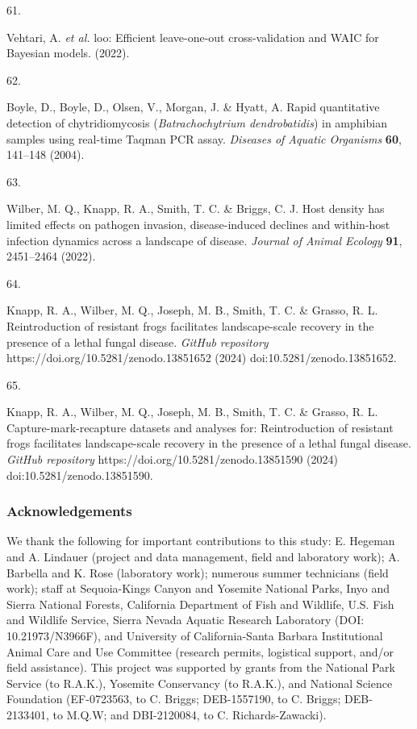\documentclass[
  letterpaper,
  DIV=11,
  numbers=noendperiod]{scrartcl}
\newlength{\cslhangindent}
\newlength{\csllabelwidth}
\newenvironment{CSLReferences}[2] %
 {\begin{list}{}{%
  \setlength{\itemindent}{0pt}
  \setlength{\leftmargin}{0pt}
  \setlength{\parsep}{0pt}
  \ifodd #1
   \setlength{\leftmargin}{\cslhangindent}
   \setlength{\itemindent}{-1\cslhangindent}
  \fi
  \setlength{\itemsep}{#2\baselineskip}}}
 {\end{list}}
\newcommand{\CSLLeftMargin}[1]{\parbox[t]{\csllabelwidth}{\strut#1\strut}}
\newcommand{\CSLRightInline}[1]{\parbox[t]{\linewidth - \csllabelwidth}{\strut#1\strut}}
\begin{document}
\begin{CSLReferences}{0}{0}
\CSLLeftMargin{61. }%
\CSLRightInline{Vehtari, A. \emph{et al.} {l}oo: Efficient leave-one-out
cross-validation and WAIC for {B}ayesian models. (2022).}

\CSLLeftMargin{62. }%
\CSLRightInline{Boyle, D., Boyle, D., Olsen, V., Morgan, J. \& Hyatt, A.
Rapid quantitative detection of chytridiomycosis
(\emph{{B}atrachochytrium dendrobatidis}) in amphibian samples using
real-time {T}aqman {PCR} assay. \emph{Diseases of Aquatic Organisms}
\textbf{60}, 141--148 (2004).}

\CSLLeftMargin{63. }%
\CSLRightInline{Wilber, M. Q., Knapp, R. A., Smith, T. C. \& Briggs, C.
J. Host density has limited effects on pathogen invasion,
disease-induced declines and within-host infection dynamics across a
landscape of disease. \emph{Journal of Animal Ecology} \textbf{91},
2451--2464 (2022).}

\CSLLeftMargin{64. }%
\CSLRightInline{Knapp, R. A., Wilber, M. Q., Joseph, M. B., Smith, T. C.
\& Grasso, R. L. Reintroduction of resistant frogs facilitates
landscape-scale recovery in the presence of a lethal fungal disease.
\emph{GitHub repository} https://doi.org/10.5281/zenodo.13851652 (2024)
doi:10.5281/zenodo.13851652.}

\CSLLeftMargin{65. }%
\CSLRightInline{Knapp, R. A., Wilber, M. Q., Joseph, M. B., Smith, T. C.
\& Grasso, R. L. Capture-mark-recapture datasets and analyses for:
Reintroduction of resistant frogs facilitates landscape-scale recovery
in the presence of a lethal fungal disease. \emph{GitHub repository}
https://doi.org/10.5281/zenodo.13851590 (2024)
doi:10.5281/zenodo.13851590.}

\end{CSLReferences}

\newpage

\subsubsection{Acknowledgements}\label{acknowledgements}

We thank the following for important contributions to this study: E.
Hegeman and A. Lindauer (project and data management, field and
laboratory work); A. Barbella and K. Rose (laboratory work); numerous
summer technicians (field work); staff at Sequoia-Kings Canyon and
Yosemite National Parks, Inyo and Sierra National Forests, California
Department of Fish and Wildlife, U.S. Fish and Wildlife Service, Sierra
Nevada Aquatic Research Laboratory (DOI: 10.21973/N3966F), and
University of California-Santa Barbara Institutional Animal Care and Use
Committee (research permits, logistical support, and/or field
assistance). This project was supported by grants from the National Park
Service (to R.A.K.), Yosemite Conservancy (to R.A.K.), and National
Science Foundation (EF-0723563, to C. Briggs; DEB-1557190, to C. Briggs;
DEB-2133401, to M.Q.W; and DBI-2120084, to C. Richards-Zawacki).
\end{document}
